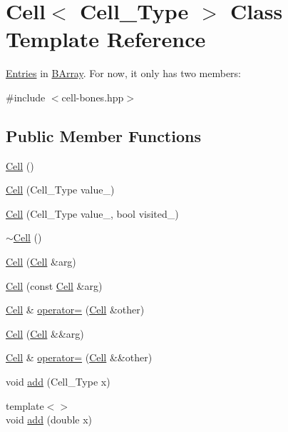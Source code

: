 \hypertarget{class_cell}{}\section{Cell$<$ Cell\+\_\+\+Type $>$ Class Template Reference}
\label{class_cell}


\hyperlink{class_entries}{Entries} in \hyperlink{class_b_array}{B\+Array}. For now, it only has two members\+:  




{\ttfamily \#include $<$cell-\/bones.\+hpp$>$}

\subsection*{Public Member Functions}
\begin{DoxyCompactItemize}
\item 
\hyperlink{class_cell_a402912c21a4c87659c0576a4bfa3c48f}{Cell} ()
\item 
\hyperlink{class_cell_a2b055170a02db6bc5f5674e81f1dd8d6}{Cell} (Cell\+\_\+\+Type value\+\_\+)
\item 
\hyperlink{class_cell_a62a4e587d2f02a22cbfae10658ec0fd5}{Cell} (Cell\+\_\+\+Type value\+\_\+, bool visited\+\_\+)
\item 
\hyperlink{class_cell_a12667d768c7eab9e295b3476a5d60c0e}{$\sim$\+Cell} ()
\item 
\hyperlink{class_cell_ac116d4235eadb134018324455a9bbdbf}{Cell} (\hyperlink{class_cell}{Cell} \&arg)
\item 
\hyperlink{class_cell_ab745c6f11e7f43f06318b4bb733d9474}{Cell} (const \hyperlink{class_cell}{Cell} \&arg)
\item 
\hyperlink{class_cell}{Cell} \& \hyperlink{class_cell_acf4bbf136ed394887c35cfd4e78f50b9}{operator=} (\hyperlink{class_cell}{Cell} \&other)
\item 
\hyperlink{class_cell_abe27b0c411864d9fce33a1cffe918169}{Cell} (\hyperlink{class_cell}{Cell} \&\&arg)
\item 
\hyperlink{class_cell}{Cell} \& \hyperlink{class_cell_a9bb18ace78fd9010b461c853ccc2c0f7}{operator=} (\hyperlink{class_cell}{Cell} \&\&other)
\item 
void \hyperlink{class_cell_a3d063afd2a8743623d0e524debbd55e9}{add} (Cell\+\_\+\+Type x)
\item 
{\footnotesize template$<$$>$ }\\void \hyperlink{class_cell_a64d4b92f322ccb8cfbad53f816d2caf8}{add} (double x)

\end{DoxyCompactItemize}
